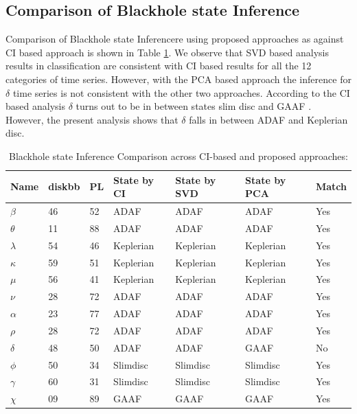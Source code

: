 \documentclass[journal]{IEEEtran}
\begin{document}
\subsection{Comparison of Blackhole state Inference}
Comparison of Blackhole state Inferencere using proposed approaches as against CI based approach \cite{Adegoke2018} is shown in Table \ref{tab:results}. We observe that SVD based analysis results in classification are consistent with CI based results for all the 12 categories of time series. However, with the PCA based approach the inference for  $\delta$ time series is not consistent with the other two approaches. According to the CI based analysis $\delta$ turns out to be in between states slim disc and GAAF \cite{Adegoke2018}. However, the present analysis shows that $\delta$ falls in between ADAF and Keplerian disc.

		\begin{table}[t]
		\caption{Blackhole state Inference Comparison across CI-based and proposed approaches:}
		\begin{center}
			\begin{tabular}{|p{0.5cm}|p{0.8cm}|p{0.75cm}|p{1.25cm}|p{1.25cm}|p{1.25cm}|p{0.70cm}|}
				\hline
				Name & diskbb & PL & State by CI & State by SVD  & State by PCA  &  Match \\
				\hline
				$\beta$ & 46 & 52 & ADAF & ADAF & ADAF & Yes\\
				\hline
                $\theta$ & 11 & 88 & ADAF & ADAF & ADAF & Yes\\
				\hline
                $\lambda$ & 54 & 46 & Keplerian & Keplerian & Keplerian & Yes\\
				\hline
               $\kappa$ & 59 & 51 & Keplerian & Keplerian & Keplerian & Yes\\
				\hline
               $\mu$ & 56 & 41 & Keplerian & Keplerian & Keplerian & Yes\\
               \hline
              $\nu$ & 28 & 72 &  ADAF & ADAF & ADAF & Yes\\
              \hline
             $\alpha$ & 23 & 77 &  ADAF & ADAF & ADAF & Yes\\
             \hline
             $\rho$ & 28 & 72 &  ADAF & ADAF & ADAF & Yes\\
\hline
 $\delta$ & 48 & 50 & ADAF & ADAF & GAAF & No\\
\hline
$\phi$ & 50 & 34 & Slimdisc & Slimdisc & Slimdisc & Yes\\
\hline
$\gamma$ & 60 & 31 & Slimdisc & Slimdisc & Slimdisc & Yes\\
\hline
$\chi$ & 09 & 89 & GAAF & GAAF & GAAF & Yes\\
				\hline
			\end{tabular}
			\label{tab:results}
		\end{center}
	\end{table}
	
\end{document}
